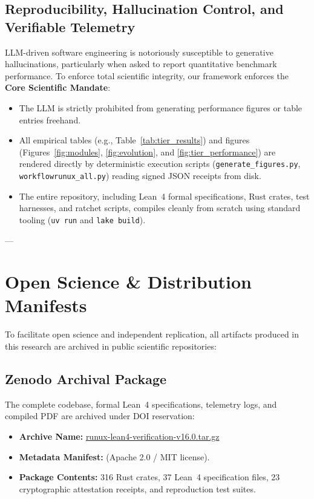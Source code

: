 \documentclass[10pt,twocolumn,letterpaper]{article}
\theoremstyle{definition}
\begin{document}
\subsection{Reproducibility, Hallucination Control, and Verifiable Telemetry}
\label{sec:reproducibility}
LLM-driven software engineering is notoriously susceptible to generative hallucinations, particularly when asked to report quantitative benchmark performance. To enforce total scientific integrity, our framework enforces the \textbf{Core Scientific Mandate}:
\begin{itemize}
    \item The LLM is strictly prohibited from generating performance figures or table entries freehand.
    \item All empirical tables (e.g., Table~\ref{tab:tier_results}) and figures (Figures~\ref{fig:modules}, \ref{fig:evolution}, and \ref{fig:tier_performance}) are rendered directly by deterministic execution scripts (\texttt{generate\_figures.py}, \texttt{workflowrunux\_all.py}) reading signed JSON receipts from disk.
    \item The entire repository, including Lean~4 formal specifications, Rust crates, test harnesses, and ratchet scripts, compiles cleanly from scratch using standard tooling (\texttt{uv run} and \texttt{lake build}).
\end{itemize}

---

\section{Open Science \& Distribution Manifests}
\label{sec:open_science}

To facilitate open science and independent replication, all artifacts produced in this research are archived in public scientific repositories:

\subsection{Zenodo Archival Package}
The complete codebase, formal Lean~4 specifications, telemetry logs, and compiled PDF are archived under DOI reservation:
\begin{itemize}
    \item \textbf{Archive Name:} {\small\url{runux-lean4-verification-v16.0.tar.gz}}
    \item \textbf{Metadata Manifest:}  (Apache 2.0 / MIT license).
    \item \textbf{Package Contents:} 316 Rust crates, 37 Lean~4 specification files, 23 cryptographic attestation receipts, and reproduction test suites.
\end{itemize}
\end{document}
